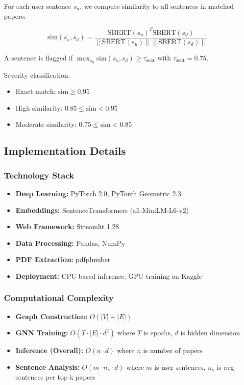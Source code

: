 \documentclass[conference]{IEEEtran}
\begin{document}
For each user sentence $s_u$, we compute similarity to all sentences in matched papers:

\begin{equation}
\text{sim}(s_u, s_d) = \frac{\text{SBERT}(s_u)^T \text{SBERT}(s_d)}{\|\text{SBERT}(s_u)\| \|\text{SBERT}(s_d)\|}
\end{equation}

A sentence is flagged if $\max_{s_d} \text{sim}(s_u, s_d) \geq \tau_{\text{sent}}$ with $\tau_{\text{sent}} = 0.75$.

Severity classification:
\begin{itemize}
    \item Exact match: $\text{sim} \geq 0.95$
    \item High similarity: $0.85 \leq \text{sim} < 0.95$
    \item Moderate similarity: $0.75 \leq \text{sim} < 0.85$
\end{itemize}

\subsection{Implementation Details}

\subsubsection{Technology Stack}
\begin{itemize}
    \item \textbf{Deep Learning:} PyTorch 2.0, PyTorch Geometric 2.3
    \item \textbf{Embeddings:} SentenceTransformers (all-MiniLM-L6-v2)
    \item \textbf{Web Framework:} Streamlit 1.28
    \item \textbf{Data Processing:} Pandas, NumPy
    \item \textbf{PDF Extraction:} pdfplumber
    \item \textbf{Deployment:} CPU-based inference, GPU training on Kaggle
\end{itemize}

\subsubsection{Computational Complexity}
\begin{itemize}
    \item \textbf{Graph Construction:} $O(|V| + |E|)$
    \item \textbf{GNN Training:} $O(T \cdot |E| \cdot d^2)$ where $T$ is epochs, $d$ is hidden dimension
    \item \textbf{Inference (Overall):} $O(n \cdot d)$ where $n$ is number of papers
    \item \textbf{Sentence Analysis:} $O(m \cdot n_s \cdot d)$ where $m$ is user sentences, $n_s$ is avg sentences per top-k papers
\end{itemize}
\end{document}
